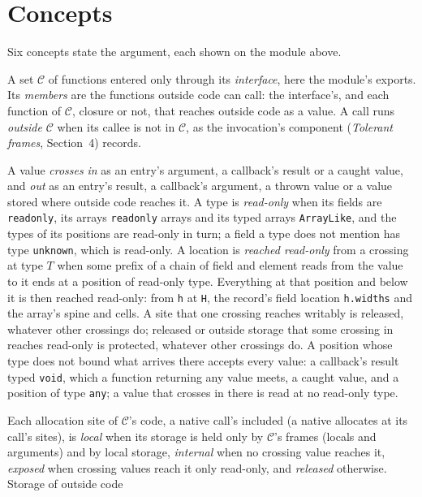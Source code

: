 \documentclass[10pt,a4paper]{article}
\theoremstyle{definition}
\theoremstyle{remark}
\newcommand{\code}[1]{\texttt{#1}}
\newcommand{\cC}{\mathcal{C}}
\begin{document}
\section{Concepts}\label{sec:concepts}

Six concepts state the argument, each shown on the module above.
\begin{description}[leftmargin=1.5em,style=nextline]
\item[Component] A set $\cC$ of functions entered only through its
\emph{interface}, here the module's exports. Its \emph{members} are the
functions outside code can call: the interface's, and each function of
$\cC$, closure or not, that reaches outside code as a value. A call runs
\emph{outside} $\cC$ when its callee is not in $\cC$, as the invocation's
component (\emph{Tolerant frames}, Section~4) records.
\item[Crossing] A value \emph{crosses} \emph{in} as an entry's argument,
a callback's result or a caught value, and \emph{out} as an entry's
result, a callback's argument, a thrown value or a value stored where
outside code reaches it. A type is \emph{read-only} when its fields are \code{readonly}, its
arrays \code{readonly} arrays and its typed arrays \code{ArrayLike}, and
the types of its positions are read-only in turn; a field a type does not
mention has type \code{unknown}, which is read-only. A location is
\emph{reached read-only} from a crossing at type $T$ when some prefix of
a chain of field and element reads from the value to it ends at a
position of read-only type. Everything at that position and below it is
then reached read-only: from \code{h} at \code{H}, the record's field location
\code{h.widths} and the array's spine and cells. A site that one crossing
reaches writably is released, whatever other crossings do; released or
outside storage that some crossing in reaches read-only is protected,
whatever other crossings do. A position whose type does not bound what
arrives there accepts every value: a callback's result typed
\code{void}, which a function returning any value meets, a caught value,
and a position of type \code{any}; a value that crosses in there is read
at no read-only type.
\item[Marks] Each allocation site of $\cC$'s code, a native call's
included (a native allocates at its call's sites), is \emph{local} when its storage is held only by $\cC$'s
frames (locals and arguments) and by local storage, \emph{internal} when
no crossing value reaches it, \emph{exposed} when crossing values reach
it only read-only, and \emph{released} otherwise. Storage of outside code

\end{description}
\end{document}
